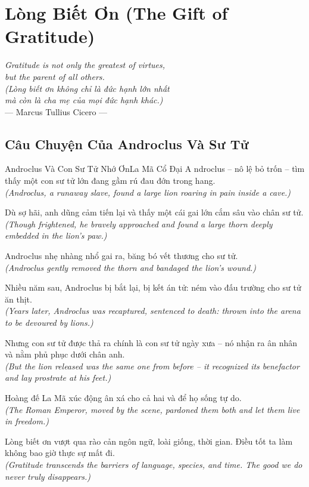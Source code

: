 \chapter{Lòng Biết Ơn (The Gift of Gratitude)}
\begin{center}
  \textit{\color{truyenblue}Gratitude is not only the greatest of virtues,\\
  but the parent of all others.}\\
  \textit{(Lòng biết ơn không chỉ là đức hạnh lớn nhất\\
  mà còn là cha mẹ của mọi đức hạnh khác.)}\\[4pt]
  \small\color{truyengold}--- Marcus Tullius Cicero ---
\end{center}
\ngancach

\section{Câu Chuyện Của Androclus Và Sư Tử}
\begin{truyen}{Androclus Và Con Sư Tử Nhớ Ơn}{La Mã Cổ Đại}
A ndroclus -- nô lệ bỏ trốn -- tìm thấy một con sư tử lớn đang gầm rú đau đớn trong hang.\\
\textit{(Androclus, a runaway slave, found a large lion roaring in pain inside a cave.)}

Dù sợ hãi, anh dũng cảm tiến lại và thấy một cái gai lớn cắm sâu vào chân sư tử.\\
\textit{(Though frightened, he bravely approached and found a large thorn deeply embedded in the lion's paw.)}

Androclus nhẹ nhàng nhổ gai ra, băng bó vết thương cho sư tử.\\
\textit{(Androclus gently removed the thorn and bandaged the lion's wound.)}

Nhiều năm sau, Androclus bị bắt lại, bị kết án tử: ném vào đấu trường cho sư tử ăn thịt.\\
\textit{(Years later, Androclus was recaptured, sentenced to death: thrown into the arena to be devoured by lions.)}

Nhưng con sư tử được thả ra chính là con sư tử ngày xưa -- nó nhận ra ân nhân và nằm phủ phục dưới chân anh.\\
\textit{(But the lion released was the same one from before -- it recognized its benefactor and lay prostrate at his feet.)}

Hoàng đế La Mã xúc động ân xá cho cả hai và để họ sống tự do.\\
\textit{(The Roman Emperor, moved by the scene, pardoned them both and let them live in freedom.)}

\end{truyen}
\begin{baihoc}
  Lòng biết ơn vượt qua rào cản ngôn ngữ, loài giống, thời gian. Điều tốt ta làm không bao giờ thực sự mất đi.\\
  \textit{(Gratitude transcends the barriers of language, species, and time. The good we do never truly disappears.)}
\end{baihoc}

